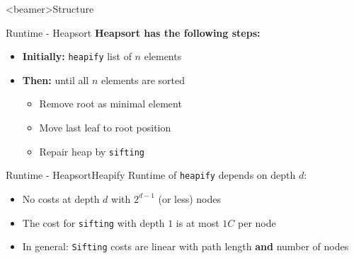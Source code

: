 \setcounter{subsubsection}{0}

\begin{frame}<beamer>{Structure}
\end{frame}


\begin{frame}{Runtime - Heapsort}
  \textbf{Heapsort has the following steps:}
  \begin{itemize}
    \item
      \textbf{Initially:} \texttt{heapify} list of $n$ elements
    \item<2- |handout:1>
    \textbf{Then:} until all $n$ elements are sorted
    \begin{itemize}
      \item<3- |handout:1>
        Remove root as minimal element
      \item<4- |handout:1>
        Move last leaf to root position
      \item<5- |handout:1>
        Repair heap by \texttt{sifting}
    \end{itemize}
  \end{itemize}
\end{frame}


\begin{frame}{Runtime - Heapsort}{Heapify}
  Runtime of \texttt{heapify} depends on depth {\color{MainA}$d$}:
  \begin{figure}[!h]
    \begin{adjustbox}{width=0.7\linewidth}
      
    \end{adjustbox}
    \vspace{-0.5em}
  \end{figure}
  \begin{itemize}
    \item<2- |handout:1>
      No costs at depth {\color{MainA}$d$} with {\color{MainA}$2^{d-1}$}
      (or less) nodes
    \item<3- |handout:1>
      The cost for \texttt{sifting} with depth {\color{MainA}$1$}
      is at most {\color{MainA}$1 C$} per node
    \item<4- |handout:1>
      In general: \texttt{Sifting} costs are linear with path length
      \textbf{and} number of nodes
  \end{itemize}
\end{frame}

